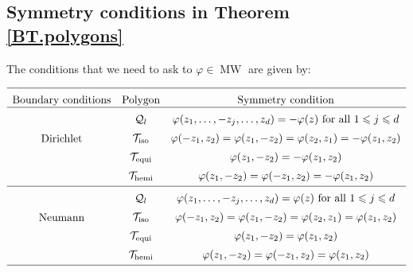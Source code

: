 \documentclass{amsart}
\theoremstyle{definition}
\theoremstyle{remark}
\newcommand{\vp}{\varphi}
\renewcommand\leq\leqslant
\numberwithin{equation}{section}
\theoremstyle{definition}
\theoremstyle{remark}
\DeclareMathOperator\MW{MW}
\begin{document}
 \subsection{Symmetry conditions in Theorem \ref{BT.polygons}}
The conditions that we need to ask to $\varphi\in\MW$ are given by:	\begin{center}
\begin{equation}\label{TableA}
		\begin{array}{ccc} 
		\hline
	\rule{0pt}{3.2ex}	\text{Boundary conditions}	& \text{Polygon} &\text{Symmetry condition} \\
		\hline
		\multirow{4}{*}{Dirichlet} & \rule{0pt}{3.2ex}\mathcal{Q}_l& \vp(z_1,\ldots,-z_j,\ldots,z_d)=-\vp(z)\text{ for all }1\leq j\leq d\\
		& \rule{0pt}{3.2ex}\mathcal{T}_{\mathrm{iso}} & \vp(-z_1,z_2)=\vp(z_1,-z_2)=\vp(z_2,z_1)=-\vp(z_1,z_2)\\
		
		&\rule{0pt}{3.2ex} \mathcal{T}_{\mathrm{equi}} & \vp(z_1,-z_2)=-\vp(z_1,z_2) \\
		&\rule{0pt}{3.2ex} \mathcal{T}_{\mathrm{hemi}} &\vp(z_1,-z_2)=\vp(-z_1,z_2)=-\vp(z_1,z_2)	\vspace{0.1cm} \\
		\hline
		\multirow{4}{*}{Neumann} &\rule{0pt}{3.2ex} \mathcal{Q}_l & \vp(z_1,\ldots,-z_j,\ldots,z_d)=\vp(z)\text{ for all }1\leq j\leq d \\
		&\rule{0pt}{3.2ex} \mathcal{T}_{\mathrm{iso}} & \vp(-z_1,z_2)=\vp(z_1,-z_2)=\vp(z_2,z_1)=\vp(z_1,z_2)   \\
		& \rule{0pt}{3.2ex}\mathcal{T}_{\mathrm{equi}} & \vp(z_1,-z_2)=\vp(z_1,z_2) \\
		& \rule{0pt}{3.2ex}\mathcal{T}_{\mathrm{hemi}} & \vp(z_1,-z_2)=\vp(-z_1,z_2)=\vp(z_1,z_2) 	\vspace{0.1cm}\\
		\hline
	\end{array} 
\end{equation}
\end{center}
\end{document}
